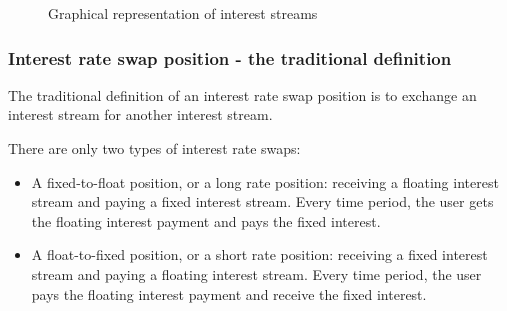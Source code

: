 \documentclass{article}%
\newcommand{\tikzPicScale}{0.8}
\newcommand\streamW{1.25}
\newcommand\streamH{3.5}
\newcommand\padding{0.5}
\newcommand\filledColor{black!50}
\newcommand{\floatingStreamPath}[2]{
    (#1 + \streamW,#2)
    -- plot[domain=0:\streamH] ({#1 + 0.2 * sin((3 * \x + 3.15) r) + 0.2}, {#2 + \x})
    -- ({#1 + \streamW},{#2 + \streamH})
    -- cycle
}
\newcommand{\fixedStreamPath}[2]{
    (#1,#2) rectangle ({#1 + \streamW},{#2 + \streamH})
}
\begin{document}
\begin{figure}
    \centering


    \caption{Graphical representation of interest streams}
    \label{fig:streams}
\end{figure}

\subsubsection{Interest rate swap position - the traditional definition}
The traditional definition of an interest rate swap position is to exchange an interest stream for another interest stream.

There are only two types of interest rate swaps:
\begin{itemize}
    \item A fixed-to-float position, or a long rate position: receiving a floating interest stream and paying a fixed interest stream. Every time period, the user gets the floating interest payment and pays the fixed interest.
    \item A float-to-fixed position, or a short rate position: receiving a fixed interest stream and paying a floating interest stream. Every time period, the user pays the floating interest payment and receive the fixed interest.
\end{itemize}
\end{document}
